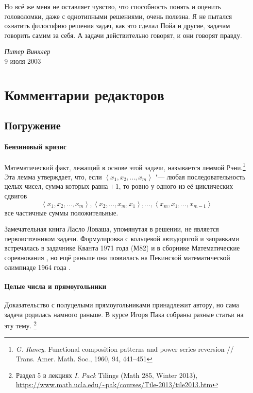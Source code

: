\documentclass[twoside]{book}
\begin{document}
Но всё же меня не оставляет чувство, что способность понять и оценить головоломки, даже с однотипными решениями, очень полезна.
Я не пытался  охватить  философию решения задач, как это сделал Пойа и другие,  задачам говорить самим за себя.
А задачи действительно говорят, и они говорят правду.

\begin{flushright}
\emph{Питер Винклер}
\\
9 июля 2003
\end{flushright}

\appendix

\chapter{Комментарии редакторов}

\section{Погружение}

\subsubsection*{Бензиновый кризис} %
Математический факт, лежащий в основе этой задачи, называется леммой Рэни.\footnote{\emph{G. Raney}. Functional composition patterns and power series reversion /\!/ Trans. Amer. Math. Soc., 1960, 94, 441--451}
Эта лемма утверждает, что, если 
$\left<x_1, x_2,\ldots, x_m\right>$ "--- любая последовательность целых чисел, сумма 
которых равна $+1$, то ровно у одного из её циклических сдвигов 
$$\left<x_1, x_2,\ldots , x_m\right>, \left<x_2, \ldots, x_m, x_1\right>, \ldots, \left<x_m, x_1, \ldots, x_{m-1}\right>$$
все частичные суммы  положительные. 

Замечательная книга Ласло Ловаша, упомянутая в решении, не является первоисточником задачи.
Формулировка с кольцевой автодорогой и заправками встречалась в задачнике Кванта 1971 года (М82)
и в сборнике Математические соревнования \cite[задачи 76 и 77]{матсоревнования}, но ещё раньше она появилась на Пекинской математической олимпиаде 1964 года \cite[№26.6]{зарубежные}.


\subsubsection*{Целые числа и прямоугольники} %
Доказательство с полуцелыми прямоугольниками принадлежит автору, но сама задача родилась намного раньше.
В курсе Игоря Пака собраны разные статьи на эту тему.%
\footnote{Раздел 5 в лекциях \emph{I. Pack} Tilings (Math 285, Winter 2013), \url{https://www.math.ucla.edu/~pak/courses/Tile-2013/tile2013.htm}}
\end{document}
